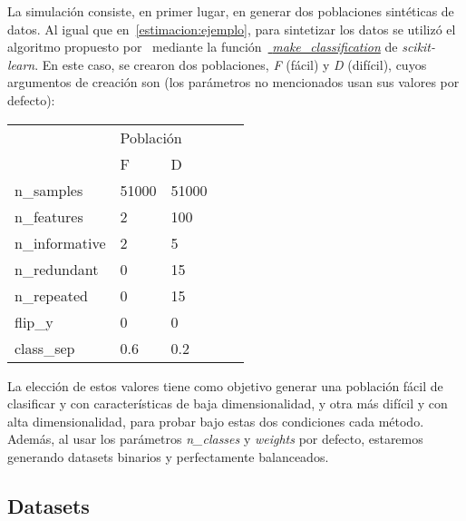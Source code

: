 La simulación consiste, en primer lugar, en generar dos poblaciones sintéticas
de datos. Al igual que en~\ref{estimacion:ejemplo}, para sintetizar los datos se
utilizó el algoritmo propuesto por~\citet{Guyon2003DesignOE} mediante la
función~\href{https://scikit-learn.org/stable/modules/generated/sklearn.datasets.make_classification.html}{{\it
make\_classification}} de {\it scikit-learn}. En este caso, se crearon dos
poblaciones, {\it F\/} (fácil) y {\it D\/} (difícil), cuyos argumentos de
creación son (los parámetros no mencionados usan sus valores por defecto):
\begin{center}
    \begin{tabular}{l|ll|ll}
        \cline{2-3}
        & \multicolumn{2}{l|}{Población} & & \\ \cline{2-3} &
        \multicolumn{1}{l|}{F}     & D     & &  \\ \cline{1-3}
        \multicolumn{1}{|l|}{n\_samples}
        & \multicolumn{1}{l|}{51000} & 51000 &  &  \\
        \multicolumn{1}{|l|}{n\_features}    & \multicolumn{1}{l|}{2}     & 100
        & &  \\
        \multicolumn{1}{|l|}{n\_informative} & \multicolumn{1}{l|}{2}     & 5 &
        &  \\
        \multicolumn{1}{|l|}{n\_redundant}   & \multicolumn{1}{l|}{0}     & 15 &
        &  \\
        \multicolumn{1}{|l|}{n\_repeated}    & \multicolumn{1}{l|}{0}     & 15 &
        &  \\
        \multicolumn{1}{|l|}{flip\_y}        & \multicolumn{1}{l|}{0}     & 0 &
        &  \\
        \multicolumn{1}{|l|}{class\_sep}     & \multicolumn{1}{l|}{0.6}   & 0.2
        &  &  \\ \cline{1-3}
    \end{tabular}
    \label{experimentos:tabla_poblaciones}
\end{center}

La elección de estos valores tiene como objetivo generar una población fácil de
clasificar y con características de baja dimensionalidad, y otra más difícil y
con alta dimensionalidad, para probar bajo estas dos condiciones cada método.
Además, al usar los parámetros {\it n\_classes\/} y {\it weights\/} por defecto,
estaremos generando datasets binarios y perfectamente balanceados.

\subsection{Datasets}\label{experimentos:datasets}

